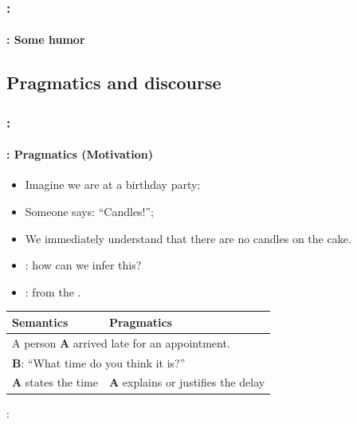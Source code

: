 \documentclass[xcolor=table]{beamer}
\begin{document}
\begin{frame}
	\frametitle{\insertshortsubtitle: \insertsection}
	\framesubtitle{\insertsubsection: Some humor}

	\begin{center}
	\end{center}

\end{frame}

\subsection{Pragmatics and discourse}

\begin{frame}
	\frametitle{\insertshortsubtitle: \insertsection}
	\framesubtitle{\insertsubsection: Pragmatics (Motivation)}
	
	\begin{minipage}{0.7\textwidth}
		\begin{itemize}
			\item Imagine we are at a birthday party;
			\item Someone says: ``Candles!'';
			\item We immediately understand that there are no candles on the cake.
			\item {}: how can we infer this?
			\item {}: from the .
		\end{itemize}
	\end{minipage}
	\begin{minipage}{0.28\textwidth}
	\end{minipage}
	
	\vfill
	\begin{tabular}{|p{}|p{}|}
		\hline
		\bfseries Semantics & \bfseries Pragmatics \\
		\hline 
		\multicolumn{2}{|l|}{A person \textbf{A} arrived late for an appointment.} \\
		\multicolumn{2}{|l|}{\textbf{B}: ``What time do you think it is?''} \\
		\hline 
		\textbf{A} states the time &  \textbf{A} explains or justifies the delay \\
		\hline
	\end{tabular}
	
	\vfill 
	
	: 
	
\end{frame}
\end{document}
